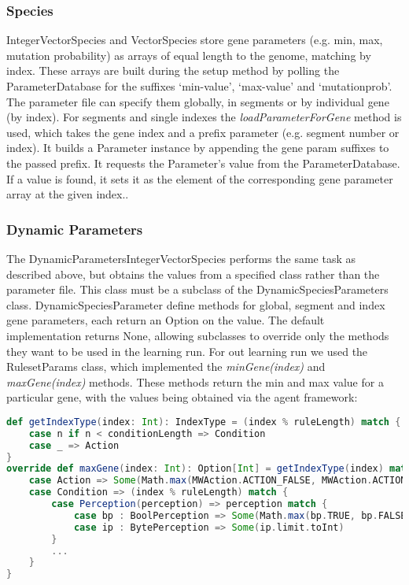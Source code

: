 \subsubsection{Species}

IntegerVectorSpecies and VectorSpecies store gene parameters (e.g. min, max, mutation probability) as arrays of equal length to the genome, matching by index. These arrays are built during the setup method by polling the ParameterDatabase for the suffixes `{\ttfamily min-value}', `{\ttfamily max-value}' and `{\ttfamily mutation\-prob}'. The parameter file can specify them globally, in segments or by individual gene (by index). For segments and single indexes the \emph{loadParameterForGene} method is used, which takes the gene index and a prefix parameter (e.g. segment number or index). It builds a Parameter instance by appending the gene param suffixes to the passed prefix. It requests the Parameter's value from the ParameterDatabase. If a value is found, it sets it as the element of the corresponding gene parameter array at the given index..

\subsubsection*{\hspace{6pt}Dynamic Parameters}

The DynamicParametersIntegerVectorSpecies performs the same task as described above, but obtains the values from a specified class rather than the parameter file. This class must be a subclass of the DynamicSpeciesParameters class. DynamicSpeciesParameter define methods for global, segment and index gene parameters, each return an Option on the value. The default implementation returns None, allowing subclasses to override only the methods they want to be used in the learning run. For out learning run we used the RulesetParams class, which implemented the \emph{minGene(index)} and \emph{maxGene(index)} methods. These methods return the min and max value for a particular gene, with the values being obtained via the agent framework:

\begin{minipage}{0.9\linewidth}
\centering
\begin{lstlisting}[language=scala]
def getIndexType(index: Int): IndexType = (index % ruleLength) match {
    case n if n < conditionLength => Condition
    case _ => Action
}
override def maxGene(index: Int): Option[Int] = getIndexType(index) match {
    case Action => Some(Math.max(MWAction.ACTION_FALSE, MWAction.ACTION_TRUE))
    case Condition => (index % ruleLength) match { 
        case Perception(perception) => perception match {
            case bp : BoolPerception => Some(Math.max(bp.TRUE, bp.FALSE))
            case ip : BytePerception => Some(ip.limit.toInt)
        }
        ...
    }
}
\end{lstlisting}
\end{minipage}

